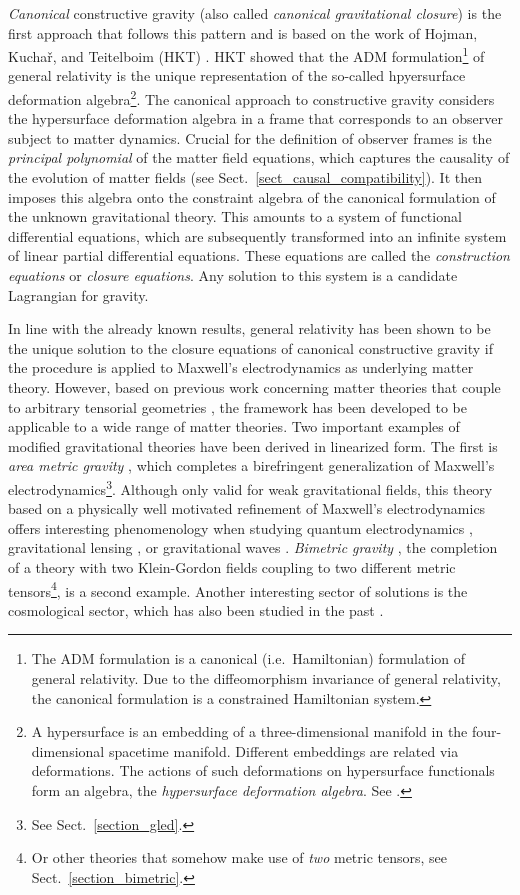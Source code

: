 \emph{Canonical} constructive gravity (also called \emph{canonical gravitational closure}) \cite{Giesel_2012,Schuller_2014,Witte_2014,D_ll_2018} is the first approach that follows this pattern and is based on the work of Hojman, Kucha\v{r}, and Teitelboim (HKT) \cite{Hojman_1976}. HKT showed that the ADM formulation\footnote{The ADM formulation \cite{Arnowitt_1960} is a canonical (i.e.\ Hamiltonian) formulation of general relativity. Due to the diffeomorphism invariance of general relativity, the canonical formulation is a constrained Hamiltonian system.} of general relativity is the unique representation of the so-called hpyersurface deformation algebra\footnote{A hypersurface is an embedding of a three-dimensional manifold in the four-dimensional spacetime manifold. Different embeddings are related via deformations. The actions of such deformations on hypersurface functionals form an algebra, the \emph{hypersurface deformation algebra}. See \cite{Hojman_1976}.}. The canonical approach to constructive gravity considers the hypersurface deformation algebra in a frame that corresponds to an observer subject to matter dynamics. Crucial for the definition of observer frames is the \emph{principal polynomial} of the matter field equations, which captures the causality of the evolution of matter fields (see Sect.~\ref{sect_causal_compatibility}). It then imposes this algebra onto the constraint algebra of the canonical formulation of the unknown gravitational theory. This amounts to a system of functional differential equations, which are subsequently transformed into an infinite system of linear partial differential equations. These equations are called the \emph{construction equations} or \emph{closure equations}. Any solution to this system is a candidate Lagrangian for gravity.

In line with the already known results, general relativity has been shown to be the unique solution to the closure equations of canonical constructive gravity if the procedure is applied to Maxwell's electrodynamics as underlying matter theory. \cite{Witte_2014} However, based on previous work concerning matter theories that couple to arbitrary tensorial geometries \cite{R_tzel_2011,Rivera_2012}, the framework has been developed to be applicable to a wide range of matter theories. Two important examples of modified gravitational theories have been derived in linearized form. The first is \emph{area metric gravity} \cite{Alex_2020_2}, which completes a birefringent generalization of Maxwell's electrodynamics\footnote{See Sect.~\ref{section_gled}.}. Although only valid for weak gravitational fields, this theory based on a physically well motivated refinement of Maxwell's electrodynamics offers interesting phenomenology when studying quantum electrodynamics \cite{GrosseHolz_2017}, gravitational lensing \cite{Schuller_2017}, or gravitational waves \cite{Alex_2019}. \emph{Bimetric gravity} \cite{Wierzba_2018,Beier_2018}, the completion of a theory with two Klein-Gordon fields coupling to two different metric tensors\footnote{Or other theories that somehow make use of \emph{two} metric tensors, see Sect.~\ref{section_bimetric}.}, is a second example. Another interesting sector of solutions is the cosmological sector, which has also been studied in the past \cite{Duell_2020}.

